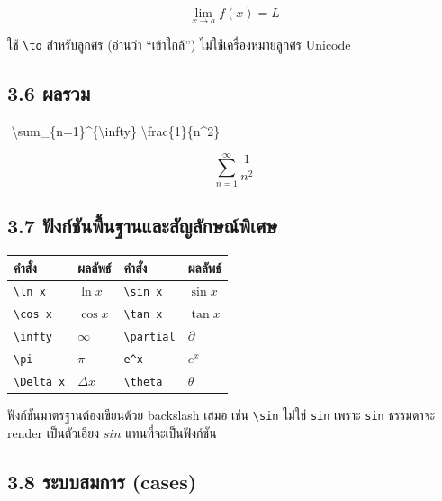 \documentclass[
  thai,
  12pt,
  letterpaper,
  DIV=11,
  numbers=noendperiod]{scrartcl}
\newenvironment{Shaded}{\begin{snugshade}}{\end{snugshade}}
\newcommand{\NormalTok}[1]{\textcolor[rgb]{0.00,0.23,0.31}{#1}}
\newcounter{none} %
\begin{document}
\[
\lim_{x \to a} f(x) = L
\]

ใช้ \texttt{\textbackslash{}to} สำหรับลูกศร (อ่านว่า ``เข้าใกล้'')
ไม่ใช้เครื่องหมายลูกศร Unicode

\subsection{3.6 ผลรวม}\label{uxe1cuxe25uxe23uxe27uxe21}

\begin{Shaded}
\begin{Highlighting}[]
\NormalTok{$$}
\NormalTok{\textbackslash{}sum\_\{n=1\}\^{}\{\textbackslash{}infty\} \textbackslash{}frac\{1\}\{n\^{}2\}}
\NormalTok{$$}
\end{Highlighting}
\end{Shaded}

\[
\sum_{n=1}^{\infty} \frac{1}{n^2}
\]

\subsection{3.7
ฟังก์ชันพื้นฐานและสัญลักษณ์พิเศษ}\label{uxe1fuxe07uxe01uxe0auxe19uxe1euxe19uxe10uxe32uxe19uxe41uxe25uxe30uxe2auxe0duxe25uxe01uxe29uxe13uxe1euxe40uxe28uxe29}

{\def\LTcaptype{none} %
\begin{longtable}[]{@{}llll@{}}
\toprule\noalign{}
คำสั่ง & ผลลัพธ์ & คำสั่ง & ผลลัพธ์ \\
\midrule\noalign{}
\endhead
\bottomrule\noalign{}
\endlastfoot
\texttt{\textbackslash{}ln\ x} & \(\ln x\) &
\texttt{\textbackslash{}sin\ x} & \(\sin x\) \\
\texttt{\textbackslash{}cos\ x} & \(\cos x\) &
\texttt{\textbackslash{}tan\ x} & \(\tan x\) \\
\texttt{\textbackslash{}infty} & \(\infty\) &
\texttt{\textbackslash{}partial} & \(\partial\) \\
\texttt{\textbackslash{}pi} & \(\pi\) & \texttt{e\^{}x} & \(e^x\) \\
\texttt{\textbackslash{}Delta\ x} & \(\Delta x\) &
\texttt{\textbackslash{}theta} & \(\theta\) \\
\end{longtable}
}

ฟังก์ชันมาตรฐานต้องเขียนด้วย backslash เสมอ เช่น \texttt{\textbackslash{}sin}
ไม่ใช่ \texttt{sin} เพราะ \texttt{sin} ธรรมดาจะ render เป็นตัวเอียง \(sin\)
แทนที่จะเป็นฟังก์ชัน

\subsection{3.8 ระบบสมการ
(cases)}\label{uxe23uxe30uxe1auxe1auxe2auxe21uxe01uxe32uxe23-cases}
\end{document}
